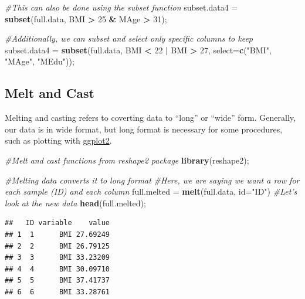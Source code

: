 \documentclass[
]{book}
\newenvironment{Shaded}{\begin{snugshade}}{\end{snugshade}}
\newcommand{\CommentTok}[1]{\textcolor[rgb]{0.56,0.35,0.01}{\textit{#1}}}
\newcommand{\DataTypeTok}[1]{\textcolor[rgb]{0.13,0.29,0.53}{#1}}
\newcommand{\DecValTok}[1]{\textcolor[rgb]{0.00,0.00,0.81}{#1}}
\newcommand{\KeywordTok}[1]{\textcolor[rgb]{0.13,0.29,0.53}{\textbf{#1}}}
\newcommand{\NormalTok}[1]{#1}
\newcommand{\OperatorTok}[1]{\textcolor[rgb]{0.81,0.36,0.00}{\textbf{#1}}}
\newcommand{\StringTok}[1]{\textcolor[rgb]{0.31,0.60,0.02}{#1}}
\begin{document}
\begin{Shaded}
\begin{Highlighting}[]
\CommentTok{#This can also be done using the subset function}
\NormalTok{subset.data4 =}\StringTok{ }\KeywordTok{subset}\NormalTok{(full.data, BMI }\OperatorTok{>}\StringTok{ }\DecValTok{25} \OperatorTok{&}\StringTok{ }\NormalTok{MAge }\OperatorTok{>}\StringTok{ }\DecValTok{31}\NormalTok{);}

\CommentTok{#Additionally, we can subset and select only specific columns to keep}
\NormalTok{subset.data4 =}\StringTok{ }\KeywordTok{subset}\NormalTok{(full.data, BMI }\OperatorTok{<}\StringTok{ }\DecValTok{22} \OperatorTok{|}\StringTok{ }\NormalTok{BMI }\OperatorTok{>}\StringTok{ }\DecValTok{27}\NormalTok{, }\DataTypeTok{select=}\KeywordTok{c}\NormalTok{(}\StringTok{"BMI"}\NormalTok{, }\StringTok{"MAge"}\NormalTok{, }\StringTok{"MEdu"}\NormalTok{));}
\end{Highlighting}
\end{Shaded}

\hypertarget{melt-and-cast}{%
\subsection{Melt and Cast}\label{melt-and-cast}}

Melting and casting refers to coverting data to ``long'' or ``wide'' form. Generally, our data is in wide format, but long format is necessary for some procedures, such as plotting with \href{https://ggplot2.tidyverse.org}{ggplot2}.

\begin{Shaded}
\begin{Highlighting}[]
\CommentTok{#Melt and cast functions from reshape2 package}
\KeywordTok{library}\NormalTok{(reshape2);}

\CommentTok{#Melting data converts it to long format}
\CommentTok{#Here, we are saying we want a row for each sample (ID) and each column }
\NormalTok{full.melted =}\StringTok{ }\KeywordTok{melt}\NormalTok{(full.data, }\DataTypeTok{id=}\StringTok{"ID"}\NormalTok{)}
\CommentTok{#Let's look at the new data}
\KeywordTok{head}\NormalTok{(full.melted);}
\end{Highlighting}
\end{Shaded}

\begin{verbatim}
##   ID variable    value
## 1  1      BMI 27.69249
## 2  2      BMI 26.79125
## 3  3      BMI 33.23209
## 4  4      BMI 30.09710
## 5  5      BMI 37.41737
## 6  6      BMI 33.28761
\end{verbatim}
\end{document}

